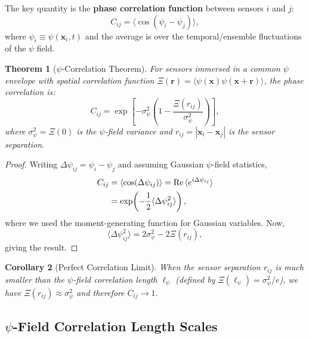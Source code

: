 \documentclass[12pt,a4paper]{article}
\newtheorem{theorem}{Theorem}[section]
\newtheorem{corollary}[theorem]{Corollary}
\theoremstyle{remark}
\begin{document}
The key quantity is the \textbf{phase correlation function} between sensors
$i$ and $j$:
\begin{equation}
\boxed{C_{ij} = \langle\cos(\psi_i - \psi_j)\rangle},
\label{eq:phase-correlation}
\end{equation}
where $\psi_i \equiv \psi(\mathbf{x}_i, t)$ and the average is over the
temporal/ensemble fluctuations of the $\psi$ field.

\begin{theorem}[$\psi$-Correlation Theorem]\label{thm:psi-corr}
For sensors immersed in a common $\psi$ envelope with spatial correlation
function $\Xi(\mathbf{r}) = \langle\psi(\mathbf{x})\psi(\mathbf{x}+\mathbf{r})\rangle$, the
phase correlation is:
\begin{equation}
C_{ij} = \exp\!\left[-\sigma_\psi^2\left(1 - \frac{\Xi(r_{ij})}{\sigma_\psi^2}\right)\right],
\label{eq:corr-theorem}
\end{equation}
where $\sigma_\psi^2 = \Xi(0)$ is the $\psi$-field variance and
$r_{ij} = |\mathbf{x}_i - \mathbf{x}_j|$ is the sensor separation.
\end{theorem}

\begin{proof}
Writing $\Delta\psi_{ij} = \psi_i - \psi_j$ and assuming Gaussian
$\psi$-field statistics,
\begin{align}
C_{ij} &= \langle\cos(\Delta\psi_{ij})\rangle
= \text{Re}\,\langle e^{i\Delta\psi_{ij}}\rangle \notag\\
&= \exp\!\left(-\frac{1}{2}\langle\Delta\psi_{ij}^2\rangle\right),
\end{align}
where we used the moment-generating function for Gaussian variables. Now,
\begin{equation}
\langle\Delta\psi_{ij}^2\rangle = 2\sigma_\psi^2 - 2\Xi(r_{ij}),
\end{equation}
giving the result.
\end{proof}

\begin{corollary}[Perfect Correlation Limit]\label{cor:perfect}
When the sensor separation $r_{ij}$ is much smaller than the $\psi$-field
correlation length $\ell_\psi$ (defined by $\Xi(\ell_\psi) = \sigma_\psi^2/e$),
we have $\Xi(r_{ij}) \approx \sigma_\psi^2$ and therefore $C_{ij} \to 1$.
\end{corollary}

\subsection{$\psi$-Field Correlation Length Scales}\label{sec:corr-lengths}
\end{document}
